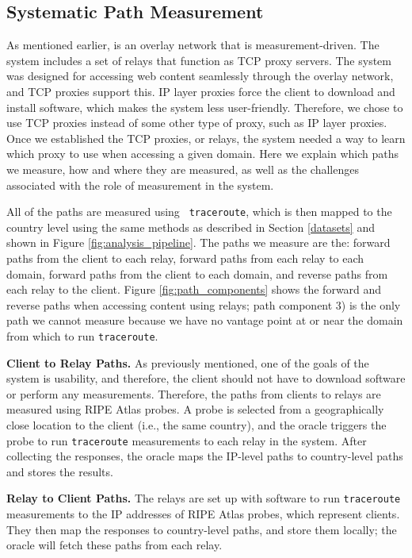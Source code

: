 \subsection{Systematic Path Measurement}
As mentioned earlier, \system{} is an overlay network that is measurement-driven.  
The system includes a set of relays that function as TCP proxy servers.  The system 
was designed for accessing web content seamlessly through the overlay network, and 
TCP proxies support this.  IP layer proxies force the client to download and 
install software, which makes the system less user-friendly.  Therefore, we 
chose to use TCP proxies instead of some other type of proxy, such as IP layer proxies.  
Once we established the TCP proxies, or relays, the system needed a way to 
learn which proxy to use when accessing a given domain.  Here we explain which paths we measure, 
how and where they are measured, as well as the challenges associated with the 
role of measurement in the system.  

All of the paths are measured using {\tt 
traceroute}, which is then mapped to the country level using the same methods as 
described in Section \ref{datasets} and shown in Figure 
\ref{fig:analysis_pipeline}.  The paths we measure are the: forward paths from 
the client to each relay, forward paths from each relay to each domain, forward 
paths from the client to each domain, and reverse paths from each relay to the 
client. Figure \ref{fig:path_components} shows the forward and reverse paths when accessing 
content using relays; path component 3) is the only path we cannot measure because we have no 
vantage point at or near the domain from which to run {\tt traceroute}.

{\bf Client to Relay Paths.} As previously mentioned, one of the goals of the 
system is usability, and therefore, the client should not have to download software 
or perform any measurements.  Therefore, 
the paths from clients to relays are measured using RIPE Atlas probes.  A probe 
is selected from a geographically close location to the client (i.e., the same 
country), and the oracle triggers the probe to run {\tt traceroute} measurements 
to each relay in the system.  After collecting the responses, the oracle maps 
the IP-level paths to country-level paths and stores the results.

{\bf Relay to Client Paths.} The relays are set up with software to run 
{\tt traceroute} measurements to the IP addresses of RIPE Atlas probes, which 
represent clients.  They then map the responses to country-level paths, and 
store them locally; the oracle will fetch these paths from each relay. 

